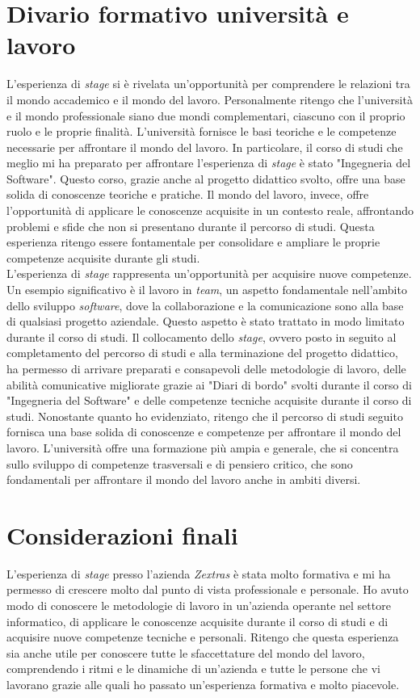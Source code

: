 \section{Divario formativo università e lavoro}
L'esperienza di \textit{stage} si è rivelata un'opportunità per comprendere le relazioni tra il mondo accademico e il mondo del lavoro. Personalmente ritengo che l'università e il mondo professionale siano due mondi complementari, ciascuno con il proprio ruolo e le proprie finalità. L'università fornisce le basi teoriche e le competenze necessarie per affrontare il mondo del lavoro. In particolare, il corso di studi che meglio mi ha preparato per affrontare l'esperienza di \textit{stage} è stato "Ingegneria del Software". Questo corso, grazie anche al progetto didattico svolto, offre una base solida di conoscenze teoriche e pratiche. Il mondo del lavoro, invece, offre l'opportunità di applicare le conoscenze acquisite in un contesto reale, affrontando problemi e sfide che non si presentano durante il percorso di studi.  Questa esperienza ritengo essere fontamentale per consolidare e ampliare le proprie competenze acquisite durante gli studi. \\
L'esperienza di \textit{stage} rappresenta un'opportunità per acquisire nuove competenze. Un esempio significativo è il lavoro in \textit{team}, un aspetto fondamentale nell'ambito dello sviluppo \textit{software}, dove la collaborazione e la comunicazione sono alla base di qualsiasi progetto aziendale. Questo aspetto è stato trattato in modo limitato durante il corso di studi. Il collocamento dello \textit{stage}, ovvero posto in seguito al completamento del percorso di studi e alla terminazione del progetto didattico, ha permesso di arrivare preparati e consapevoli delle metodologie di lavoro, delle abilità comunicative migliorate grazie ai "Diari di bordo" svolti durante il corso di "Ingegneria del Software" e delle competenze tecniche acquisite durante il corso di studi. 
Nonostante quanto ho evidenziato, ritengo che il percorso di studi seguito fornisca una base solida di conoscenze e competenze per affrontare il mondo del lavoro. L'università offre una formazione più ampia e generale, che si concentra sullo sviluppo di competenze trasversali e di pensiero critico, che sono fondamentali per affrontare il mondo del lavoro anche in ambiti diversi. 
\section{Considerazioni finali}
L'esperienza di \textit{stage} presso l'azienda \textit{Zextras} è stata molto formativa e mi ha permesso di crescere molto dal punto di vista professionale e personale. Ho avuto modo di conoscere le metodologie di lavoro in un'azienda operante nel settore informatico, di applicare le conoscenze acquisite durante il corso di studi e di acquisire nuove competenze tecniche e personali. Ritengo che questa esperienza sia anche utile per conoscere tutte le sfaccettature del mondo del lavoro, comprendendo i ritmi e le dinamiche di un'azienda e tutte le persone che vi lavorano grazie alle quali ho passato un'esperienza formativa e molto piacevole.
